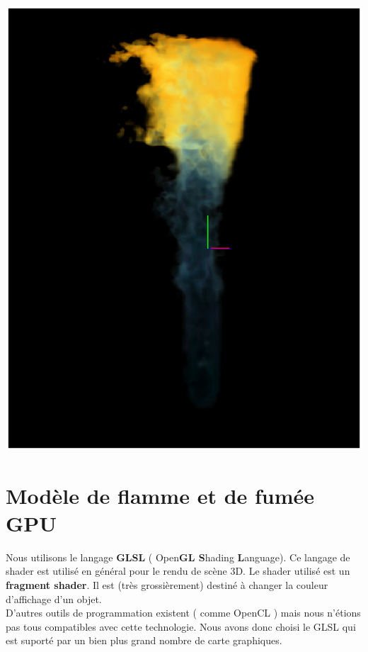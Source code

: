 \documentclass[a4paper,10pt]{article}
\begin{document}
\begin{center}
	\includegraphics[scale=0.7]{FlammeBleue2.ps}
    \end{center}  




\newpage
\section{Modèle de flamme et de fumée GPU}

Nous utilisons le langage \textbf{GLSL} ( Open\textbf{GL S}hading
\textbf{L}anguage).  Ce langage de shader est utilisé en général pour
le rendu de scène 3D. Le shader utilisé est un \textbf{fragment
  shader}.  Il est (très grossièrement) destiné à changer la couleur
d'affichage d'un objet.\\ 
D'autres outils de programmation existent (
comme OpenCL ) mais nous n'étions pas tous compatibles avec cette
technologie.  Nous avons donc choisi le GLSL qui est suporté par un
bien plus grand nombre de carte graphiques.\\
\end{document}
